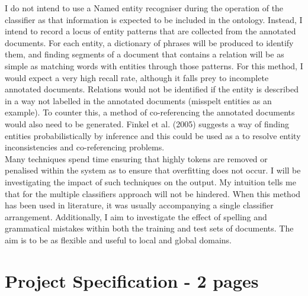 \documentclass{ecmm427_assignment}
\begin{document}
I do not intend to use a Named entity recogniser during the operation of the classifier as that information is expected to be included in the ontology. Instead, I intend to record a locus of entity patterns that are collected from the annotated documents. For each entity, a dictionary of phrases will be produced to identify them, and finding segments of a document that contains a relation will be as simple as matching words with entities through those patterns. For this method, I would expect a very high recall rate, although it falls prey to incomplete annotated documents. Relations would not be identified if the entity is described in a way not labelled in the annotated documents (misspelt entities as an example). To counter this, a method of co-referencing the annotated documents would also need to be generated. Finkel et al. (2005) suggests a way of finding entities probabilistically by inference and this could be used as a to resolve entity inconsistencies and co-referencing problems.\\

Many techniques spend time ensuring that highly tokens are removed or penalised within the system as to ensure that overfitting does not occur. I will be investigating the impact of such techniques on the output. My intuition tells me that for the multiple classifiers approach will not be hindered. When this method has been used in literature, it was usually accompanying a single classifier arrangement. Additionally, I aim to investigate the effect of spelling and grammatical mistakes within both the training and test sets of documents. The aim is to be as flexible and useful to local and global domains.

\section{Project Specification - 2 pages}
\end{document}
